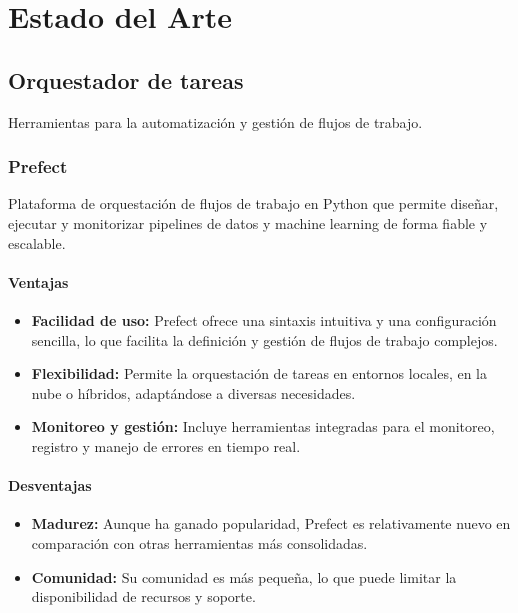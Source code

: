 
\chapter{Estado del Arte}
\label{marcoteorico}

\section{Orquestador de tareas}
Herramientas para la automatización y gestión de flujos de trabajo.

\subsection{Prefect}
Plataforma de orquestación de flujos de trabajo en Python que permite diseñar, ejecutar y monitorizar pipelines de datos y machine learning de forma fiable y escalable.

\subsubsection{Ventajas}
\begin{itemize}
    \item \textbf{Facilidad de uso:} Prefect ofrece una sintaxis intuitiva y una configuración sencilla, lo que facilita la definición y gestión de flujos de trabajo complejos.
    
    \item \textbf{Flexibilidad:} Permite la orquestación de tareas en entornos locales, en la nube o híbridos, adaptándose a diversas necesidades.
    
    \item \textbf{Monitoreo y gestión:} Incluye herramientas integradas para el monitoreo, registro y manejo de errores en tiempo real.
\end{itemize}

\subsubsection{Desventajas}
\begin{itemize}
    \item \textbf{Madurez:} Aunque ha ganado popularidad, Prefect es relativamente nuevo en comparación con otras herramientas más consolidadas.
    
    \item \textbf{Comunidad:} Su comunidad es más pequeña, lo que puede limitar la disponibilidad de recursos y soporte.
\end{itemize}

